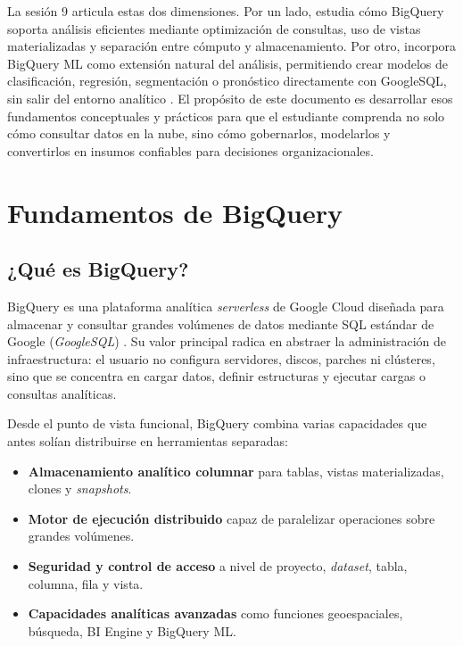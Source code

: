 \documentclass[12pt]{article}
\begin{document}
La sesión 9 articula estas dos dimensiones. Por un lado, estudia cómo BigQuery soporta análisis eficientes mediante optimización de consultas, uso de vistas materializadas y separación entre cómputo y almacenamiento. Por otro, incorpora BigQuery ML como extensión natural del análisis, permitiendo crear modelos de clasificación, regresión, segmentación o pronóstico directamente con GoogleSQL, sin salir del entorno analítico \cite{gcp_bqml_create_model,gcp_bqml_intro}. El propósito de este documento es desarrollar esos fundamentos conceptuales y prácticos para que el estudiante comprenda no solo cómo consultar datos en la nube, sino cómo gobernarlos, modelarlos y convertirlos en insumos confiables para decisiones organizacionales.

\section{Fundamentos de BigQuery}
\subsection{¿Qué es BigQuery?}
BigQuery es una plataforma analítica \textit{serverless} de Google Cloud diseñada para almacenar y consultar grandes volúmenes de datos mediante SQL estándar de Google (\textit{GoogleSQL}) \cite{gcp_bigquery_overview}. Su valor principal radica en abstraer la administración de infraestructura: el usuario no configura servidores, discos, parches ni clústeres, sino que se concentra en cargar datos, definir estructuras y ejecutar cargas o consultas analíticas.

Desde el punto de vista funcional, BigQuery combina varias capacidades que antes solían distribuirse en herramientas separadas:

\begin{itemize}[leftmargin=*]
\item \textbf{Almacenamiento analítico columnar} para tablas, vistas materializadas, clones y \textit{snapshots}.
\item \textbf{Motor de ejecución distribuido} capaz de paralelizar operaciones sobre grandes volúmenes.
\item \textbf{Seguridad y control de acceso} a nivel de proyecto, \textit{dataset}, tabla, columna, fila y vista.
\item \textbf{Capacidades analíticas avanzadas} como funciones geoespaciales, búsqueda, BI Engine y BigQuery ML.
\end{itemize}
\end{document}
